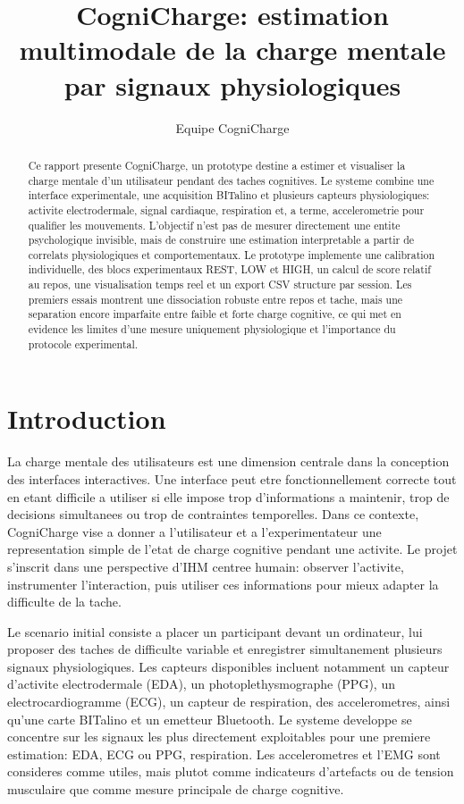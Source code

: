 \documentclass[runningheads]{llncs}
\title{CogniCharge: estimation multimodale de la charge mentale par signaux physiologiques}
\author{Equipe CogniCharge}
\institute{Projet d'IHM et cognition -- remplacer par les noms des membres de l'equipe}
\begin{document}
\maketitle

\begin{abstract}
Ce rapport presente CogniCharge, un prototype destine a estimer et visualiser la charge mentale d'un utilisateur pendant des taches cognitives. Le systeme combine une interface experimentale, une acquisition BITalino et plusieurs capteurs physiologiques: activite electrodermale, signal cardiaque, respiration et, a terme, accelerometrie pour qualifier les mouvements. L'objectif n'est pas de mesurer directement une entite psychologique invisible, mais de construire une estimation interpretable a partir de correlats physiologiques et comportementaux. Le prototype implemente une calibration individuelle, des blocs experimentaux REST, LOW et HIGH, un calcul de score relatif au repos, une visualisation temps reel et un export CSV structure par session. Les premiers essais montrent une dissociation robuste entre repos et tache, mais une separation encore imparfaite entre faible et forte charge cognitive, ce qui met en evidence les limites d'une mesure uniquement physiologique et l'importance du protocole experimental.

\end{abstract}

\section{Introduction}

La charge mentale des utilisateurs est une dimension centrale dans la conception des interfaces interactives. Une interface peut etre fonctionnellement correcte tout en etant difficile a utiliser si elle impose trop d'informations a maintenir, trop de decisions simultanees ou trop de contraintes temporelles. Dans ce contexte, CogniCharge vise a donner a l'utilisateur et a l'experimentateur une representation simple de l'etat de charge cognitive pendant une activite. Le projet s'inscrit dans une perspective d'IHM centree humain: observer l'activite, instrumenter l'interaction, puis utiliser ces informations pour mieux adapter la difficulte de la tache.

Le scenario initial consiste a placer un participant devant un ordinateur, lui proposer des taches de difficulte variable et enregistrer simultanement plusieurs signaux physiologiques. Les capteurs disponibles incluent notamment un capteur d'activite electrodermale (EDA), un photoplethysmographe (PPG), un electrocardiogramme (ECG), un capteur de respiration, des accelerometres, ainsi qu'une carte BITalino et un emetteur Bluetooth. Le systeme developpe se concentre sur les signaux les plus directement exploitables pour une premiere estimation: EDA, ECG ou PPG, respiration. Les accelerometres et l'EMG sont consideres comme utiles, mais plutot comme indicateurs d'artefacts ou de tension musculaire que comme mesure principale de charge cognitive.
\end{document}
